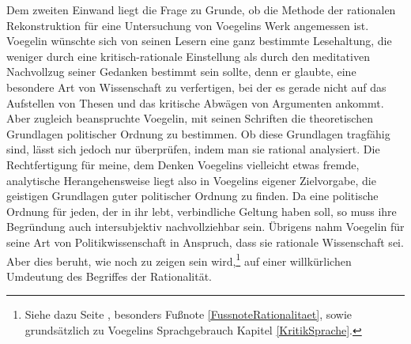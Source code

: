 Dem zweiten Einwand liegt die Frage zu Grunde, ob die Methode der rationalen
Rekonstruktion für eine Untersuchung von Voegelins Werk angemessen ist.
Voegelin wünschte sich von seinen Lesern eine ganz bestimmte Lesehaltung, die
weniger durch eine kritisch-rationale Einstellung als durch den meditativen
Nachvollzug seiner Gedanken bestimmt sein sollte, denn er glaubte, eine
besondere Art von Wissenschaft zu verfertigen, bei der es gerade nicht auf das
Aufstellen von Thesen und das kritische Abwägen von Argumenten ankommt. Aber
zugleich beanspruchte Voegelin, mit seinen Schriften die theoretischen
Grundlagen politischer Ordnung zu bestimmen. Ob diese Grundlagen tragfähig
sind, lässt sich jedoch nur überprüfen, indem man sie rational analysiert. Die
Rechtfertigung für meine, dem Denken Voegelins vielleicht etwas fremde,
analytische Herangehensweise liegt also in Voegelins eigener Zielvorgabe, die
geistigen Grundlagen guter politischer Ordnung zu finden. Da eine politische
Ordnung für jeden, der in ihr lebt, verbindliche Geltung haben soll, so muss
ihre Begründung auch intersubjektiv nachvollziehbar sein.  Übrigens nahm
Voegelin für seine Art von Politikwissenschaft in Anspruch, dass sie rationale
Wissenschaft sei. Aber dies beruht, wie noch zu zeigen sein
wird,\footnote{Siehe dazu Seite \pageref{Rationalitaetsbegriff}, besonders
  Fußnote \ref{FussnoteRationalitaet}, sowie grundsätzlich zu Voegelins
  Sprachgebrauch Kapitel \ref{KritikSprache}.} auf einer willkürlichen
Umdeutung des Begriffes der Rationalität.

